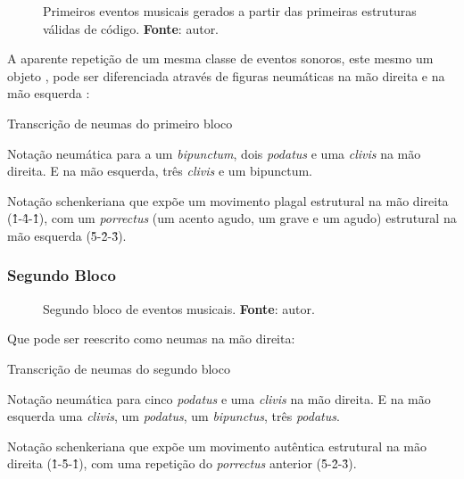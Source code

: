 \begin{figure}[!h]
  \centering
  
  \caption{Primeiros eventos musicais gerados a partir das primeiras estruturas válidas de código. \textbf{Fonte}: autor.}
  \label{fig:ask3}
\end{figure}

A aparente repetição de um mesma classe de eventos sonoros, este mesmo um objeto , pode ser diferenciada através de figuras neumáticas na mão direita e na mão esquerda :

\begin{example}{Transcrição de neumas do primeiro bloco}\label{fig:neumaMD1}

  Notação neumática para a um \emph{bipunctum}, dois \emph{podatus} e uma \emph{clivis} na mão direita. E na mão esquerda, três \emph{clivis} e um bipunctum. 

  \centering{}

  Notação schenkeriana que expõe um movimento plagal estrutural na mão direita (\^1-\^4-\^1), com um \emph{porrectus} (um acento agudo, um grave e um agudo) estrutural na mão esquerda (\^5-\^2-\^3).

  \centering{}

\end{example}

\subsubsection*{Segundo Bloco}

\begin{figure}[!h]
  \centering
  
  \caption{Segundo bloco de eventos musicais. \textbf{Fonte}: autor.}
  \label{fig:ask3}
\end{figure}

Que pode ser reescrito como neumas na mão direita:

\begin{example}{Transcrição de neumas do segundo bloco}\label{fig:neumaMD2}

  Notação neumática para cinco \emph{podatus} e uma \emph{clivis} na mão direita. E na mão esquerda uma \emph{clivis}, um \emph{podatus}, um \emph{bipunctus}, três \emph{podatus}.

  \centering{}

 Notação schenkeriana que expõe um movimento autêntica estrutural na mão direita (\^1-\^5-\^1), com uma repetição do \emph{porrectus} anterior (\^5-\^2-\^3).

  \centering{}
\end{example}

